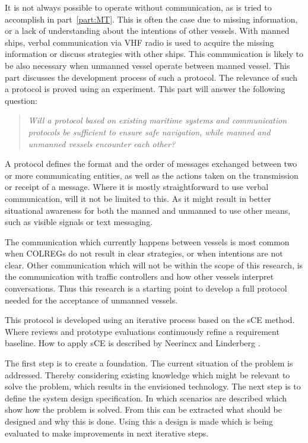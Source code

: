 It is not always possible to operate without communication, as is tried to accomplish in part~\ref{part:MT}. This is often the case due to missing information, or a lack of understanding about the intentions of other vessels. With manned ships, verbal communication via \ac{VHF} radio is used to acquire the missing information or discuss strategies with other ships. This communication is likely to be also necessary when unmanned vessel operate between manned vessel. This part discusses the development process of such a protocol. The relevance of such a protocol is proved using an experiment. This part will answer the following question:

\begin{quotation}
	\emph{Will a protocol based on existing maritime systems and communication protocols be sufficient to ensure safe navigation, while manned and unmanned vessels encounter each other?}
\end{quotation}

A protocol defines the format and the order of messages exchanged between two or more communicating entities, as well as the actions taken on the transmission or receipt of a message. Where it is mostly straightforward to use verbal communication, will it not be limited to this. As it might result in better situational awareness for both the manned and unmanned to use other means, such as visible signals or text messaging.

The communication which currently happens between vessels is most common when \ac{COLREGs} do not result in clear strategies, or when intentions are not clear. Other communication which will not be within the scope of this research, is the communication with traffic controllers and how other vessels interpret conversations.
Thus this research is a starting point to develop a full protocol needed for the acceptance of unmanned vessels.

This protocol is developed using an iterative process based on the \acf{sCE} method. Where reviews and prototype evaluations continuously refine a requirement baseline. How to apply \ac{sCE} is described by Neerincx and Linderberg \cite{Neerincx2012}.

The first step is to create a foundation. The current situation of the problem is addressed. Thereby considering existing knowledge which might be relevant to solve the problem, which results in the envisioned technology. The next step is to define the system design specification. In which scenarios are described which show how the problem is solved. From this can be extracted what should be designed and why this is done. Using this a design is made which is being evaluated to make improvements in next iterative steps.